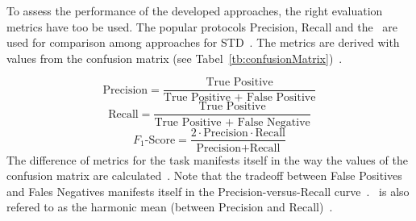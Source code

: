 To assess the performance of the developed approaches, the right evaluation metrics
have too be used.
The popular protocols Precision, Recall and the \fone\ are used for
comparison among approaches for \ac{STD}~\citep{long_scene_2021}.
The metrics are derived with values from the confusion matrix (see
Tabel~\ref{tb:confusionMatrix})~\citep{davis_relationship_2006}.
\begin{table}[ht]
    \centering\scriptsize
    \caption{Confusion Matrix\label{tb:confusionMatrix}}
\end{table}
\begin{equation}\label{eq:P}
    \text{Precision}=\frac{\text{True Positive}}{\text{True Positive + False Positive}}
\end{equation}
\begin{equation}\label{eq:R}
    \text{Recall}=\frac{\text{True Positive}}{\text{True Positive + False Negative}}
\end{equation}
\begin{equation}\label{eq:f1}
    F_1\text{-Score}=\frac{2\cdot \text{Precision}\cdot \text{Recall}}{\text{Precision}+\text{Recall}}
\end{equation}
The difference of metrics for the task manifests itself in the way the values of the confusion matrix
are calculated~\citep{long_scene_2021}.
Note that the tradeoff between False Positives and Fales Negatives manifests itself in the
Precision-versus-Recall curve~\citep{su_relationship_2015}.
\fone\ is also refered to as the harmonic mean (between Precision and Recall)~\citep{he_icpr2018_2018}.
